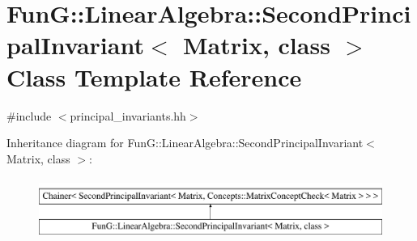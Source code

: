 \hypertarget{classFunG_1_1LinearAlgebra_1_1SecondPrincipalInvariant}{}\section{FunG\+:\+:Linear\+Algebra\+:\+:Second\+Principal\+Invariant$<$ Matrix, class $>$ Class Template Reference}
\label{classFunG_1_1LinearAlgebra_1_1SecondPrincipalInvariant}


{\ttfamily \#include $<$principal\+\_\+invariants.\+hh$>$}

Inheritance diagram for FunG\+:\+:Linear\+Algebra\+:\+:Second\+Principal\+Invariant$<$ Matrix, class $>$\+:\begin{figure}[H]
\begin{center}
\leavevmode
\includegraphics[height=2.000000cm]{classFunG_1_1LinearAlgebra_1_1SecondPrincipalInvariant}
\end{center}
\end{figure}
